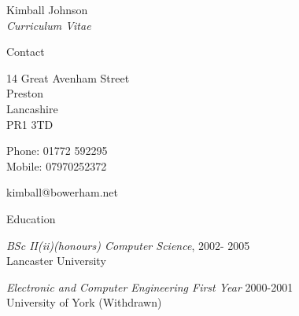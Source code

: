 \documentclass[10pt]{article}
\begin{document}
\newlength{\oldcvlabelwidth}
\renewcommand*{\cvbibname}{}

\begin{cv}{Kimball Johnson\\{\large \itshape Curriculum Vitae}}

\begin{cvlist}{Contact}
	\item
	14 Great Avenham Street\\
	Preston\\
	Lancashire\\
	PR1 3TD
	\item Phone: 01772 592295\\
	Mobile: 07970252372
	\item kimball@bowerham.net
\end{cvlist}

\begin{cvlist}{Education}
	\item \emph{BSc II(ii)(honours) Computer Science}, 2002- 2005\\
	Lancaster University
    \item \emph{Electronic and Computer Engineering First Year} 2000-2001\\
    University of York (Withdrawn)
\end{cvlist}


\end{cv}
\end{document}
